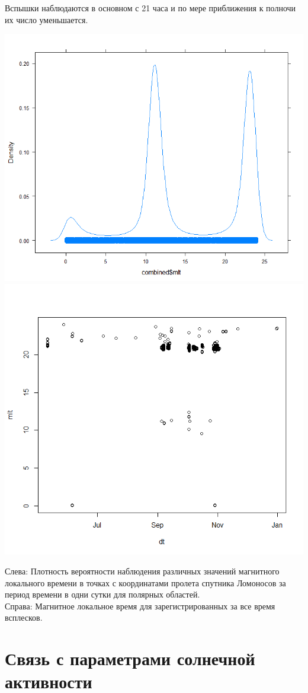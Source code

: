 \documentclass[t, aspectratio=43]{beamer}
\begin{document}
\begin{frame}	
\frametitle{\insertsection} 

{\tiny Вспышки наблюдаются в основном с 21 часа и по мере приближения к полночи их число уменьшается.}

	\centering
	\includegraphics[width=0.49\linewidth]{images/Rplot020}
	\includegraphics[width=0.49\linewidth, trim={0 1cm 0 0}, clip]{images/Rplot14}
	
	\tiny{Слева: Плотность вероятности наблюдения различных значений магнитного локального времени в точках с координатами пролета спутника Ломоносов за период времени в одни сутки для полярных областей. \\Справа: Магнитное локальное время для зарегистрированных за все время всплесков.}

\end{frame}

\section{Связь с параметрами солнечной активности}
\end{document}
